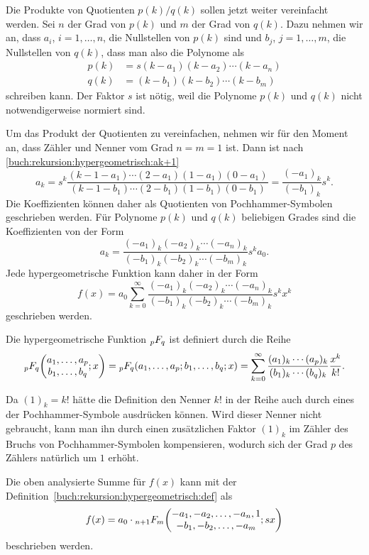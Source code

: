 Die Produkte von Quotienten $p(k)/q(k)$ sollen jetzt weiter
vereinfacht werden.
Sei $n$ der Grad von $p(k)$ und $m$ der Grad von $q(k)$.
Dazu nehmen wir an, dass $a_i$, $i=1,\dots,n$, die Nullstellen von $p(k)$ sind
und $b_j$, $j=1,\dots,m$, die Nullstellen von $q(k)$, dass man also
die Polynome als
\begin{align*}
p(k) &= s(k-a_1)(k-a_2)\cdots(k-a_n)
\\
q(k) &= (k-b_1)(k-b_2)\cdots(k-b_m)
\end{align*}
schreiben kann.
Der Faktor $s$ ist nötig, weil die Polynome $p(k)$ und $q(k)$ nicht
notwendigerweise normiert sind.

Um das Produkt der Quotienten zu vereinfachen, nehmen wir für den Moment
an, dass Zähler und Nenner vom Grad $n=m=1$ ist.
Dann ist nach 
\eqref{buch:rekursion:hypergeometrisch:ak+1}
\[
a_{k}
=
s^{k}
\frac{
(k-1-a_1) \cdots (2-a_1)(1-a_1)(0-a_1)
}{
(k-1-b_1) \cdots (2-b_1)(1-b_1)(0-b_1)
}
=
\frac{(-a_1)_k}{(-b_1)_k} s^k.
\]
Die Koeffizienten können daher als Quotienten von Pochhammer-Symbolen
geschrieben werden.
Für Polynome $p(k)$ und $q(k)$ beliebigen Grades sind die Koeffizienten
von der Form
\[
a_k
=
\frac{(-a_1)_k(-a_2)_k\cdots (-a_n)_k}{(-b_1)_k(-b_2)_k\cdots(-b_m)_k}
s^ka_0.
\]
Jede hypergeometrische Funktion kann daher in der Form
\[
f(x)
=
a_0
\sum_{k=0}^\infty
\frac{(-a_1)_k(-a_2)_k\cdots (-a_n)_k}{(-b_1)_k(-b_2)_k\cdots(-b_m)_k}
s^k
x^k
\]
geschrieben werden.

\begin{definition}
\label{buch:rekursion:hypergeometrisch:def}
Die hypergeometrische Funktion
$\mathstrut_pF_q$ ist definiert durch die Reihe
\[
\mathstrut_pF_q
\biggl(
\begin{matrix}
a_1,\dots,a_p\\
b_1,\dots,b_q
\end{matrix}
;
x
\biggr)
=
\mathstrut_pF_q(a_1,\dots,a_p;b_1,\dots,b_q;x)
=
\sum_{k=0}^\infty
\frac{(a_1)_k\cdots(a_p)_k}{(b_1)_k\cdots(b_q)_k}\frac{x^k}{k!}.
\]
\end{definition}

Da $(1)_k=k!$ hätte die Definition den Nenner $k!$ in der Reihe
auch durch eines der Pochhammer-Symbole ausdrücken können.
Wird dieser Nenner nicht gebraucht, kann man ihn durch einen 
zusätzlichen Faktor $(1)_k$ im Zähler des Bruchs von Pochhammer-Symbolen
kompensieren, wodurch sich der Grad $p$ des Zählers natürlich um $1$
erhöht.

Die oben analysierte Summe für $f(x)$ kann mit der
Definition~\ref{buch:rekursion:hypergeometrisch:def} als
\[
f(x)
=
a_0
\cdot
\mathstrut_{n+1}F_m \biggl(
\begin{matrix}
-a_1,-a_2,\dots,-a_n,1\\
-b_1,-b_2,\dots,-a_m
\end{matrix}; sx
\biggr)
\]
beschrieben werden.

